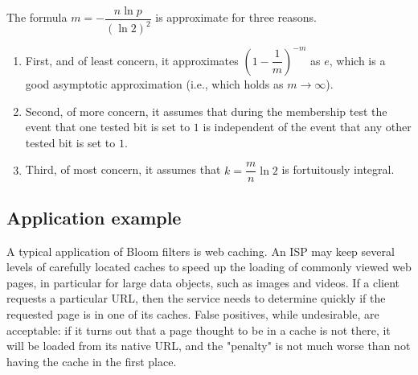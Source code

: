 The formula $m = -\dfrac{n \ln p}{(\ln 2)^2}$ is approximate for three reasons.
\begin{enumerate}
\item First, and of least concern, it approximates $(1 - \dfrac{1}{m})^{-m}$ as $e$, which is a good asymptotic approximation (i.e., which holds as $m \to \infty$).
\item Second, of more concern, it assumes that during the membership test the event that one tested bit is set to $1$ is independent of the event that any other tested bit is set to $1$.
\item Third, of most concern, it assumes that $k = \dfrac{m}{n} \ln 2$ is fortuitously integral.
\end{enumerate}

\subsection{Application example}
A typical application of Bloom filters is web caching.
An ISP may keep several levels of carefully located caches to speed up the loading of commonly viewed web pages, in particular for large data objects, such as images and videos.
If a client requests a particular URL, then the service needs to determine quickly if the requested page is in one of its caches.
False positives, while undesirable, are acceptable: if it turns out that a page thought to be in a cache is not there, it will be loaded from its native URL,
and the "penalty" is not much worse than not having the cache in the first place.

